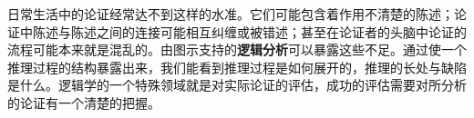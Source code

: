 日常生活中的论证经常达不到这样的水准。它们可能包含着作用不清楚的陈述；论证中陈述与陈述之间的连接可能相互纠缠或被错述；甚至在论证者的头脑中论证的流程可能本来就是混乱的。由图示支持的\textbf{逻辑分析}可以暴露这些不足。通过使一个推理过程的结构暴露出来，我们能看到推理过程是如何展开的，推理的长处与缺陷是什么。逻辑学的一个特殊领域就是对实际论证的评估，成功的评估需要对所分析的论证有一个清楚的把握。

